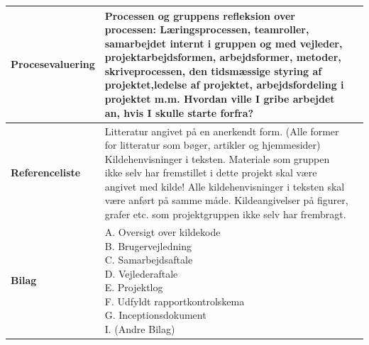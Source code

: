 \begin{longtable}{|p{30mm}|p{90mm}|p{25mm}|}
\textbf{Procesevaluering}   & Processen og gruppens refleksion over processen: Læringsprocessen, teamroller, samarbejdet internt i gruppen og med vejleder, projektarbejdsformen, arbejdsformer, metoder, skriveprocessen, den tidsmæssige styring af projektet,ledelse af projektet, arbejdsfordeling i projektet m.m. 
Hvordan ville I gribe arbejdet an, hvis I skulle starte forfra?
                                        &           \\ \hline

\textbf{Referenceliste}   & Litteratur angivet på en anerkendt form. 
(Alle former for litteratur som bøger, artikler og hjemmesider)
Kildehenvisninger i teksten. Materiale som gruppen ikke selv har fremstillet i dette projekt skal være angivet med kilde! 
Alle kildehenvisninger i teksten skal være anført på samme måde. Kildeangivelser på figurer, grafer etc. som projektgruppen ikke selv har frembragt. 
                                        &           \\ \hline

\textbf{Bilag}   &
\makecell{
A. Oversigt over kildekode \\
B. Brugervejledning \\
C. Samarbejdsaftale \\
D. Vejlederaftale \\
E. Projektlog \\
F. Udfyldt rapportkontrolskema \\
G. Inceptionsdokument \\
I.  (Andre Bilag) \\
}
                                        &           \\ \hline

\end{longtable}

